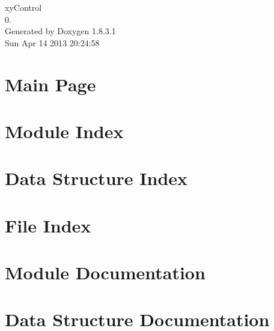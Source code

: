 \documentclass{book}
\begin{document}
\hypersetup{pageanchor=false,citecolor=blue}
\begin{titlepage}
\vspace*{7cm}
\begin{center}
{\Large xy\-Control \\[1ex]\large 0. }\\
\vspace*{1cm}
{\large Generated by Doxygen 1.8.3.1}\\
\vspace*{0.5cm}
{\small Sun Apr 14 2013 20:24:58}\\
\end{center}
\end{titlepage}
\clearemptydoublepage
{}
\tableofcontents
\clearemptydoublepage
{}
\hypersetup{pageanchor=true,citecolor=blue}
\chapter{Main Page}
\label{index}\hypertarget{index}{}
\chapter{Module Index}

\chapter{Data Structure Index}

\chapter{File Index}

\chapter{Module Documentation}

























\chapter{Data Structure Documentation}








\end{document}
